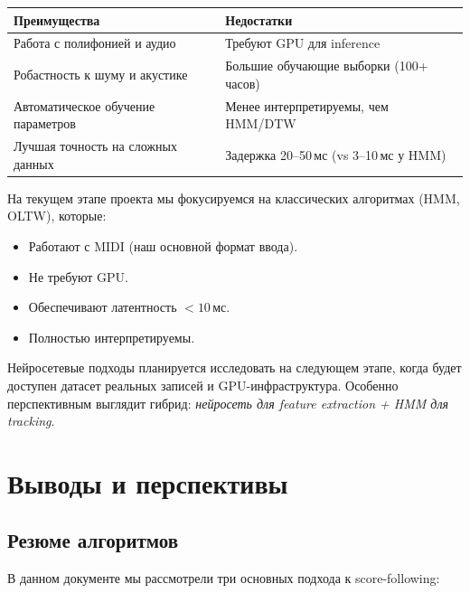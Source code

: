 \documentclass[a4paper,11pt]{article}
\begin{document}
\begin{center}
\begin{tabular}{p{6.5cm}p{6.5cm}}
\toprule
\textbf{Преимущества} & \textbf{Недостатки} \\
\midrule
Работа с полифонией и аудио & Требуют GPU для inference \\
Робастность к шуму и акустике & Большие обучающие выборки (100+ часов) \\
Автоматическое обучение параметров & Менее интерпретируемы, чем HMM/DTW \\
Лучшая точность на сложных данных & Задержка 20--50\,мс (vs 3--10\,мс у HMM) \\
\bottomrule
\end{tabular}
\end{center}

\begin{notebox}[title={Перспективы для проекта MusicTech}]
На текущем этапе проекта мы фокусируемся на классических алгоритмах
(HMM, OLTW), которые:
\begin{itemize}[leftmargin=1.5em]
  \item Работают с MIDI (наш основной формат ввода).
  \item Не требуют GPU.
  \item Обеспечивают латентность $< 10$\,мс.
  \item Полностью интерпретируемы.
\end{itemize}

Нейросетевые подходы планируется исследовать на следующем этапе,
когда будет доступен датасет реальных записей и GPU-инфраструктура.
Особенно перспективным выглядит гибрид: \emph{нейросеть для feature
extraction + HMM для tracking}.
\end{notebox}


\section{Выводы и перспективы}
\label{sec:conclusion}

\subsection{Резюме алгоритмов}

В данном документе мы рассмотрели три основных подхода к score-following:
\end{document}

